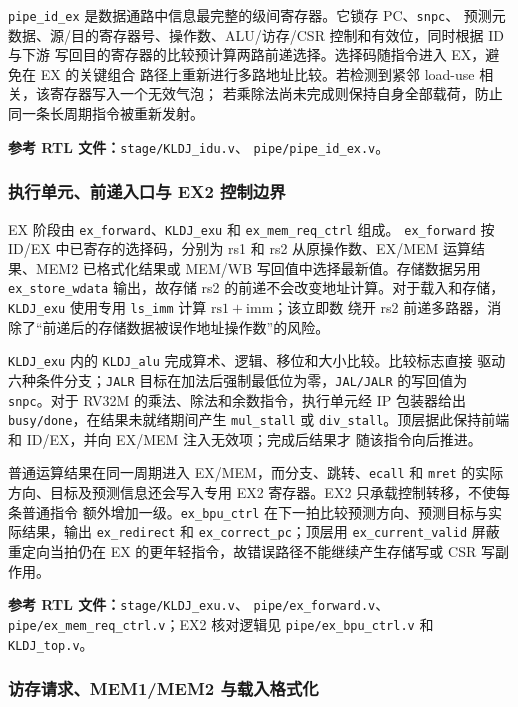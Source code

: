 \documentclass[UTF8,zihao=-4,a4paper]{ctexart}
\numberwithin{table}{section}
\numberwithin{figure}{section}
\newcommand{\code}[1]{\texttt{#1}}
\begin{document}
\code{pipe\_id\_ex} 是数据通路中信息最完整的级间寄存器。它锁存 PC、\code{snpc}、
预测元数据、源/目的寄存器号、操作数、ALU/访存/CSR 控制和有效位，同时根据 ID 与下游
写回目的寄存器的比较预计算两路前递选择。选择码随指令进入 EX，避免在 EX 的关键组合
路径上重新进行多路地址比较。若检测到紧邻 load-use 相关，该寄存器写入一个无效气泡；
若乘除法尚未完成则保持自身全部载荷，防止同一条长周期指令被重新发射。

\noindent\textbf{参考 RTL 文件：}\code{stage/KLDJ\_idu.v}、
\code{pipe/pipe\_id\_ex.v}。

\subsubsection{执行单元、前递入口与 EX2 控制边界}

EX 阶段由 \code{ex\_forward}、\code{KLDJ\_exu} 和 \code{ex\_mem\_req\_ctrl} 组成。
\code{ex\_forward} 按 ID/EX 中已寄存的选择码，分别为 rs1 和 rs2 从原操作数、EX/MEM
运算结果、MEM2 已格式化结果或 MEM/WB 写回值中选择最新值。存储数据另用
\code{ex\_store\_wdata} 输出，故存储 rs2 的前递不会改变地址计算。对于载入和存储，
\code{KLDJ\_exu} 使用专用 \code{ls\_imm} 计算 \(\mathrm{rs1}+\mathrm{imm}\)；该立即数
绕开 rs2 前递多路器，消除了“前递后的存储数据被误作地址操作数”的风险。

\code{KLDJ\_exu} 内的 \code{KLDJ\_alu} 完成算术、逻辑、移位和大小比较。比较标志直接
驱动六种条件分支；\code{JALR} 目标在加法后强制最低位为零，\code{JAL/JALR} 的写回值为
\code{snpc}。对于 RV32M 的乘法、除法和余数指令，执行单元经 IP 包装器给出
\code{busy/done}，在结果未就绪期间产生 \code{mul\_stall} 或
\code{div\_stall}。顶层据此保持前端和 ID/EX，并向 EX/MEM 注入无效项；完成后结果才
随该指令向后推进。

普通运算结果在同一周期进入 EX/MEM，而分支、跳转、\code{ecall} 和 \code{mret} 的实际
方向、目标及预测信息还会写入专用 EX2 寄存器。EX2 只承载控制转移，不使每条普通指令
额外增加一级。\code{ex\_bpu\_ctrl} 在下一拍比较预测方向、预测目标与实际结果，输出
\code{ex\_redirect} 和 \code{ex\_correct\_pc}；顶层用 \code{ex\_current\_valid}
屏蔽重定向当拍仍在 EX 的更年轻指令，故错误路径不能继续产生存储写或 CSR 写副作用。

\noindent\textbf{参考 RTL 文件：}\code{stage/KLDJ\_exu.v}、
\code{pipe/ex\_forward.v}、\code{pipe/ex\_mem\_req\_ctrl.v}；EX2 核对逻辑见
\code{pipe/ex\_bpu\_ctrl.v} 和 \code{KLDJ\_top.v}。

\subsubsection{访存请求、MEM1/MEM2 与载入格式化}
\end{document}

